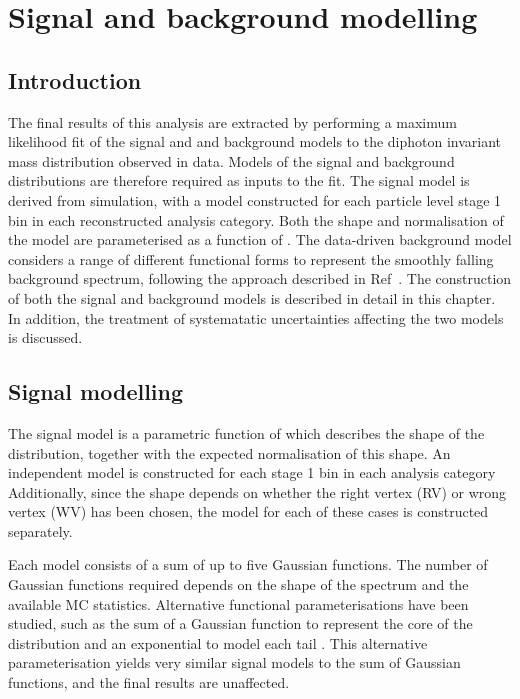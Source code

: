 \chapter{Signal and background modelling}
\label{chap:sigbkg}

\section{Introduction}

The final results of this analysis are extracted by performing a maximum likelihood fit 
of the signal and and background models to the diphoton invariant mass distribution observed in data.
Models of the signal and background \mgg distributions are therefore required as inputs to the fit.
The signal model is derived from simulation, 
with a model constructed for each particle level stage 1 bin in each reconstructed analysis category.
Both the shape and normalisation of the model are parameterised as a function of \mH.
The data-driven background model considers a range of different functional forms to 
represent the smoothly falling background spectrum, 
following the approach described in Ref~\cite{Envelope}.
The construction of both the signal and background models is described in detail in this chapter.
In addition, the treatment of systematatic uncertainties affecting the two models is discussed.

\section{Signal modelling}

The signal model is a parametric function of \mH which describes the shape of the \mgg distribution, 
together with the expected normalisation of this shape.
An independent model is constructed for each stage 1 bin in each analysis category
Additionally, since the \mgg shape depends on whether the right vertex (RV) 
or wrong vertex (WV) has been chosen, the model for each of these cases is constructed separately.

Each model consists of a sum of up to five Gaussian functions.
The number of Gaussian functions required depends on the shape of the \mgg spectrum 
and the available MC statistics.
Alternative functional parameterisations have been studied, 
such as the sum of a Gaussian function to represent the core of the \mgg distribution 
and an exponential to model each tail \cite{LouieThesis}.
This alternative parameterisation yields very similar signal models to the sum of Gaussian functions, 
and the final results are unaffected.

